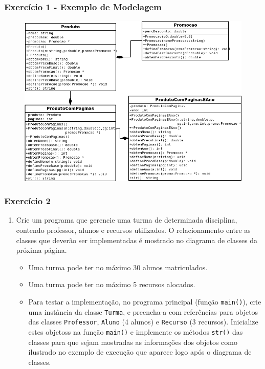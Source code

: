 \documentclass[aspectratio=169]{beamer}
\newcommand\setItemnumber[1]{\setcounter{enumi}{\numexpr#1-1\relax}}
\begin{document}
\begin{frame}\frametitle{Exercício 1 - Exemplo de Modelagem}
\begin{figure}[h]
	\centering
	\includegraphics[height=0.7\paperheight]{imagens/modelagem_livraria2.png}
\end{figure}
\end{frame}

\begin{frame}\frametitle{Exercício 2}
\begin{enumerate}
	\setItemnumber{2}
	\item Crie um programa que gerencie uma turma de determinada disciplina, contendo professor, alunos e recursos utilizados. O relacionamento entre as classes que deverão ser implementadas é mostrado no diagrama de classes da próxima página.
	\begin{itemize}
		\item Uma turma pode ter no máximo 30 alunos matriculados.
		\item Uma turma pode ter no máximo 5 recursos alocados.
		\item Para testar a implementação, no programa principal (função \texttt{main()}), crie uma instância da classe \texttt{Turma}, e preencha-a com referências para objetos das classes \texttt{Professor}, \texttt{Aluno} (4 alunos) e \texttt{Recurso} (3 recursos). Inicialize estes objetoss na função \texttt{main()} e implemente os métodos \texttt{str()} das classes para que sejam mostradas as informações dos objetos como ilustrado no exemplo de execução que aparece logo após o diagrama de classes.
	\end{itemize}
\end{enumerate}
\end{frame}
\end{document}
